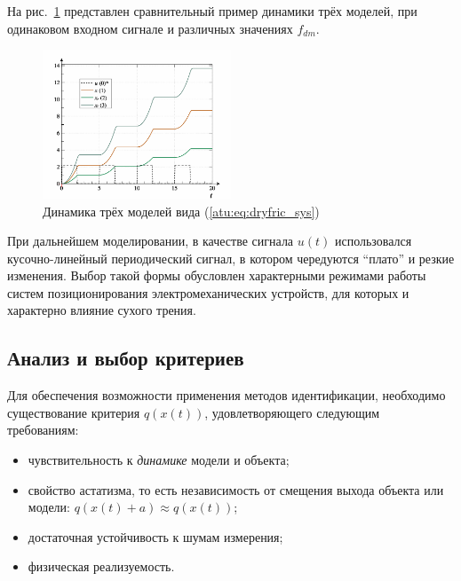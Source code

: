 На рис.~\ref{atu:f:fric_outs} представлен сравнительный пример динамики трёх
моделей, при одинаковом входном сигнале
и различных значениях $f_{dm}$.

\begin{figure}[htb!]
  \centerline{
    \includegraphics[width=0.5\textwidth]{p/cha/fric/fric_outs1.png}
  }
  \caption{Динамика трёх моделей вида (\ref{atu:eq:dryfric_sys})}
  \label{atu:f:fric_outs}
\end{figure}

При дальнейшем моделировании, в качестве сигнала $u(t)$ использовался кусочно-линейный периодический сигнал,
в котором чередуются ``плато'' и резкие изменения. Выбор такой формы обусловлен
характерными режимами работы систем позиционирования электромеханических
устройств, для которых и характерно влияние сухого трения.


\subsection{Анализ и выбор критериев}  %

Для обеспечения возможности применения методов идентификации,
необходимо существование критерия
\( q(x(t)) \),
удовлетворяющего следующим требованиям:

\begin{itemize}

\item
чувствительность к \textit{динамике} модели и объекта;

\item
свойство астатизма, то есть
независимость
от смещения выхода объекта или модели:
\( q(x(t)+a ) \approx q( x(t) ) \);

\item
достаточная устойчивость к шумам измерения;

\item
физическая реализуемость.

\end{itemize}

